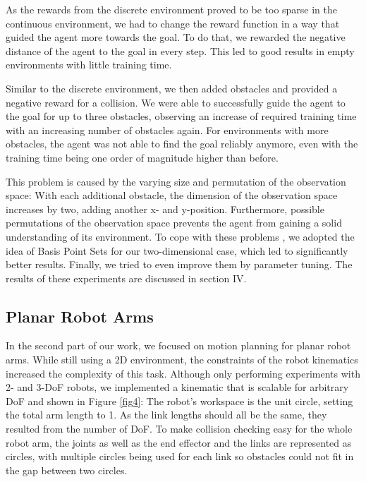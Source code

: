 \documentclass[conference]{IEEEtran}
\begin{document}
As the rewards from the discrete environment proved to be too sparse in the continuous environment, we had to change the reward function in a way that guided the agent more towards the goal. To do that, we rewarded the negative distance of the agent to the goal in every step. This led to good results in empty environments with little training time.

Similar to the discrete environment, we then added obstacles and provided a negative reward for a collision. We were able to successfully guide the agent to the goal for up to three obstacles, observing an increase of required training time with an increasing number of obstacles again. For environments with more obstacles, the agent was not able to find the goal reliably anymore, even with the training time being one order of magnitude higher than before.

This problem is caused by the varying size and permutation of the observation space: With each additional obstacle, the dimension of the observation space increases by two, adding another x- and y-position. Furthermore, possible permutations of the observation space prevents the agent from gaining a solid understanding of its environment. To cope with these problems , we adopted the idea of Basis Point Sets \cite{b2} for our two-dimensional case, which led to significantly better results. Finally, we tried to even improve them by parameter tuning. The results of these experiments are discussed in section IV.

\subsection{Planar Robot Arms}

In the second part of our work, we focused on motion planning for planar robot arms. While still using a 2D environment, the constraints of the robot kinematics increased the complexity of this task. Although only performing experiments with 2- and 3-DoF robots, we implemented a kinematic that is scalable for arbitrary DoF and shown in Figure \ref{fig4}: The robot's workspace is the unit circle, setting the total arm length to 1. As the link lengths should all be the same, they resulted from the number of DoF. To make collision checking easy for the whole robot arm, the joints as well as the end effector and the links are represented as circles, with multiple circles being used for each link so obstacles could not fit in the gap between two circles. 
\end{document}
